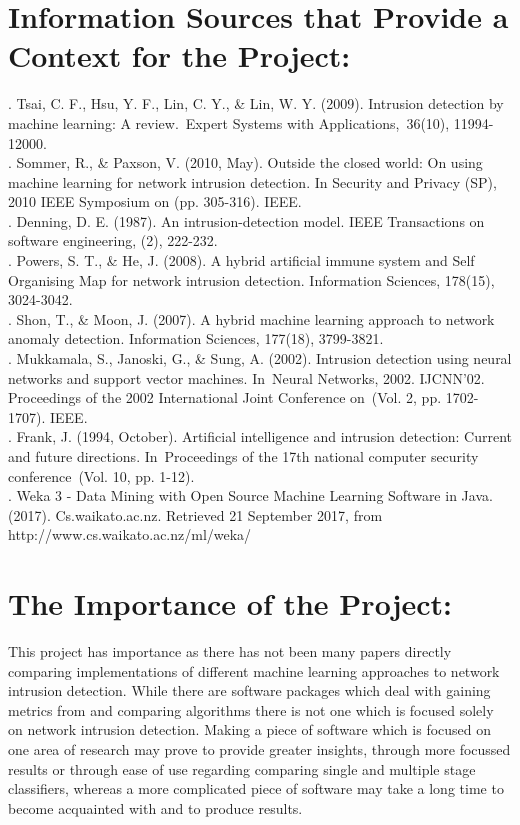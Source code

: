 \section*{Information Sources that Provide a Context for the Project:}
. Tsai, C. F., Hsu, Y. F., Lin, C. Y., & Lin, W. Y. (2009). Intrusion detection by machine learning: A review. Expert Systems with Applications, 36(10), 11994-12000. \\

. Sommer, R., & Paxson, V. (2010, May). Outside the closed world: On using machine learning for network intrusion detection. In Security and Privacy (SP), 2010 IEEE Symposium on (pp. 305-316). IEEE. \\

. Denning, D. E. (1987). An intrusion-detection model. IEEE Transactions on software engineering, (2), 222-232. \\

. Powers, S. T., & He, J. (2008). A hybrid artificial immune system and Self Organising Map for network intrusion detection. Information Sciences, 178(15), 3024-3042. \\

. Shon, T., & Moon, J. (2007). A hybrid machine learning approach to network anomaly detection. Information Sciences, 177(18), 3799-3821. \\

. Mukkamala, S., Janoski, G., & Sung, A. (2002). Intrusion detection using neural networks and support vector machines. In Neural Networks, 2002. IJCNN'02. Proceedings of the 2002 International Joint Conference on (Vol. 2, pp. 1702-1707). IEEE. \\

. Frank, J. (1994, October). Artificial intelligence and intrusion detection: Current and future directions. In Proceedings of the 17th national computer security conference (Vol. 10, pp. 1-12). \\

. Weka 3 - Data Mining with Open Source Machine Learning Software in Java. (2017). Cs.waikato.ac.nz. Retrieved 21 September 2017, from http://www.cs.waikato.ac.nz/ml/weka/ \\

\section*{The Importance of the Project:}
\noindent This project has importance as there has not been many papers directly comparing implementations of different machine learning approaches to network intrusion detection. While there are software packages which deal with gaining metrics from and comparing algorithms there is not one which is focused solely on network intrusion detection. Making a piece of software which is focused on one area of research may prove to provide greater insights, through more focussed results or through ease of use regarding comparing single and multiple stage classifiers, whereas a more complicated piece of software may take a long time to become acquainted with and to produce results. \\


